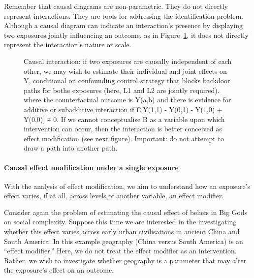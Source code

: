 \documentclass[
  singlecolumn]{article}
\let\oldparagraph\paragraph
\renewcommand{\paragraph}[1]{\oldparagraph{#1}\mbox{}}
\begin{document}
Remember that causal diagrams are non-parametric. They do not directly
represent interactions. They are tools for addressing the identification
problem. Although a causal diagram can indicate an interaction's
presence by displaying two exposures jointly influencing an outcome, as
in Figure~\ref{fig-dag-interaction}, it does not directly represent the
interaction's nature or scale.

\begin{figure}


\caption{\label{fig-dag-interaction}Causal interaction: if two exposures
are causally independent of each other, we may wish to estimate their
individual and joint effects on Y, conditional on confounding control
strategy that blocks backdoor paths for bothe exposures (here, L1 and L2
are jointly required). where the counterfactual outcome is Y(a,b) and
there is evidence for additive or subadditive interaction if E{[}Y(1,1)
- Y(0,1) - Y(1,0) + Y(0,0){]} ≠ 0. If we cannot conceptualise B as a
variable upon which intervention can occur, then the interaction is
better conceived as effect modification (see next figure). Important: do
not attempt to draw a path into another path.}

\end{figure}%

\paragraph{\texorpdfstring{\textbf{Causal effect modification under a
single
exposure}}{Causal effect modification under a single exposure}}\label{causal-effect-modification-under-a-single-exposure}

With the analysis of effect modification, we aim to understand how an
exposure's effect varies, if at all, across levels of another variable,
an effect modifier.

Consider again the problem of estimating the causal effect of beliefs in
Big Gods on social complexity. Suppose this time we are interested in
the investigating whether this effect varies across early urban
civilisations in ancient China and South America. In this example
geography (China versus South America) is an ``effect modifier.'' Here,
we do not treat the effect modifier as an intervention. Rather, we wish
to investigate whether geography is a parameter that may alter the
exposure's effect on an outcome.
\end{document}
